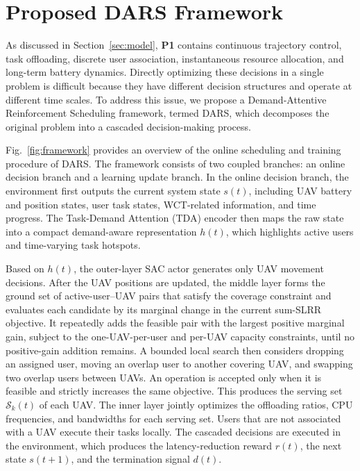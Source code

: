 \documentclass[journal]{IEEEtran}
\begin{document}

\section{Proposed DARS Framework}\label{sec:solution}

As discussed in Section~\ref{sec:model}, \textbf{P1} contains continuous trajectory control,
task offloading, discrete user association, instantaneous resource allocation,
and long-term battery dynamics. Directly optimizing these decisions in a
single problem is difficult because they have different decision structures
and operate at different time scales. To address this issue, we propose a
Demand-Attentive Reinforcement Scheduling framework, termed DARS, which
decomposes the original problem into a cascaded decision-making process.

Fig.~\ref{fig:framework} provides an overview of the online scheduling and training procedure of DARS. The framework consists of two coupled branches: an online decision branch and a learning update branch. In the online decision branch, the environment first outputs the current system state $s(t)$, including UAV battery and position states, user task states, WCT-related information, and time progress. The Task-Demand Attention (TDA) encoder then maps the raw state into a compact demand-aware representation $h(t)$, which highlights active users and time-varying task hotspots.

Based on $h(t)$, the outer-layer SAC actor generates only UAV movement
decisions. After the UAV positions are updated, the middle layer
forms the ground set of active-user--UAV pairs that satisfy the coverage
constraint and evaluates each candidate by its marginal change in the current
sum-SLRR objective. It repeatedly adds the feasible pair with the largest
positive marginal gain, subject to the one-UAV-per-user and per-UAV capacity
constraints, until no positive-gain addition remains. A bounded local search
then considers dropping an assigned user, moving an overlap user to another
covering UAV, and swapping two overlap users between UAVs. An operation is
accepted only when it is feasible and strictly increases the same objective.
This produces the serving set $\mathcal{S}_k(t)$ of each UAV. The inner layer
jointly optimizes the offloading ratios, CPU frequencies, and bandwidths for
each serving set. Users that are not associated with a UAV execute their tasks
locally.
The cascaded decisions are executed in the environment, which produces the latency-reduction reward $r(t)$, the next state $s(t+1)$, and the termination signal $d(t)$.
\end{document}
